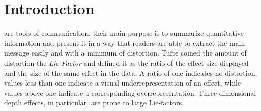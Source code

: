 \section{Introduction}
%
%



% 
% 
% 
% 
 are tools of communication: their main purpose is  to summarize quantitative information and present it in a way that readers are able to extract the main message easily and with a minimum of distortion. Tufte  coined the amount of distortion the \emph{Lie-Factor} \citep[p. 57--69]{tufte} and defined it as the ratio of the effect size displayed and the size of the same effect in the data. A ratio of one indicates no distortion, values less than one indicate a visual underrepresentation of an effect, while values above one indicate a corresponding overrepresentation. Three-dimensional depth effects, in particular, are prone to large Lie-factors.

